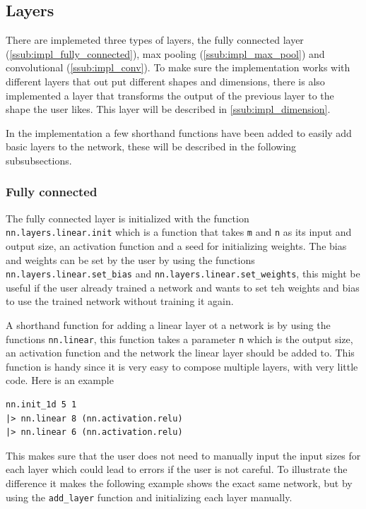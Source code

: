 \subsection{Layers}%
\label{sub:layers}

There are implemeted three types of layers, the fully connected layer (\autoref{ssub:impl_fully_connected}), max pooling (\autoref{ssub:impl_max_pool}) and convolutional (\autoref{ssub:impl_conv}).
To make sure the implementation works with different layers that out put different shapes and dimensions, there is also implemented a layer that transforms the output of the previous layer to the shape the user likes. This layer will be described in \autoref{ssub:impl_dimension}.

In the implementation a few shorthand functions have been added to easily add basic layers to the network, these will be described in the following subsubsections.

\subsubsection{Fully connected}%
\label{ssub:impl_fully_connected}

The fully connected layer is initialized with the function\\ \texttt{nn.layers.linear.init} which is a function that takes \texttt{m} and \texttt{n} as its input and output size, an activation function and a seed for initializing weights.
The bias and weights can be set by the user by using the functions\\ \texttt{nn.layers.linear.set\_bias} and \texttt{nn.layers.linear.set\_weights}, this might be useful if the user already trained a network and wants to set teh weights and bias to use the trained network without training it again.

A shorthand function for adding a linear layer ot a network is by using the functions \texttt{nn.linear}, this function takes a parameter \texttt{n} which is the output size, an activation function and the network the linear layer should be added to. This function is handy since it is very easy to compose multiple layers, with very little code. Here is an example

\begin{lstlisting}
nn.init_1d 5 1
|> nn.linear 8 (nn.activation.relu)
|> nn.linear 6 (nn.activation.relu)
\end{lstlisting}

This makes sure that the user does not need to manually input the input sizes for each layer which could lead to errors if the user is not careful.
To illustrate the difference it makes the following example shows the exact same network, but by using the \texttt{add\_layer} function and initializing each layer manually.

